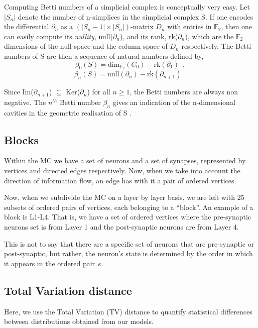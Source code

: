 Computing Betti numbers of a simplicial complex is conceptually very easy. Let $|S_n|$ denote the number of n-simplices in the simplicial complex S. If one encodes the differential $\partial_{n}$ as a $(|S_n-1| \times |S_n|)$-matrix $D_n$ with entries in $\mathbb{F}_2$, then one can easily compute its \textit{nullity}, null($\partial_n$), and its rank, rk($\partial_n$), which are the $\mathbb{F}_2$ dimensions of the null-space and the column space of $D_n$ respectively. The Betti numbers of S are then a sequence of natural numbers defined by,
\begin{equation}
    \beta_0(S) = \text{dim}_{\mathbb{F}_2}(C_0) - \text{rk}(\partial_1) \enspace{,}
\end{equation}
\begin{equation}
    \beta_{n}(S) = \text{null}(\partial_{n}) - \text{rk}(\partial_{n+1}) \enspace{.}
\end{equation}
    
Since Im($\partial_{n+1}$) $\subseteq$ Ker($\partial_n$) for all $n\geq 1$, the Betti numbers are always non negative. The $n^{th}$ Betti number $\beta_n$ gives an indication of the n-dimensional cavities in the geometric realisation of S \cite{Reimann_2017}.

\subsection{Blocks}
Within the MC we have a set of neurons and a set of synapses, represented by vertices and directed edges respectively. Now, when we take into account the direction of information flow, an edge has with it a pair of ordered vertices. 

Now, when we subdivide the MC on a layer by layer basis, we are left with 25 subsets of ordered pairs of vertices, each belonging to a ``block''. An example of a block is L1-L4. That is, we have a set of ordered vertices where the pre-synaptic neurons set is from Layer 1 and the post-synaptic neurons are from Layer 4. 

This is not to say that there are a specific set of neurons that are pre-synaptic or post-synaptic, but rather, the neuron's state is determined by the order in which it appears in the ordered pair $\emph{e}$.


\subsection{Total Variation distance}
Here, we use the Total Variation (TV) distance to quantify statistical differences between distributions obtained from our models.

